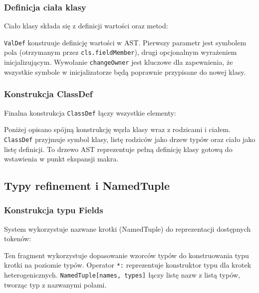 \subsubsection{Definicja ciała klasy}\label{subsubsec:definicja-ciaa-klasy}

Ciało klasy składa się z definicji wartości oraz metod:



\texttt{ValDef} konstruuje definicję wartości w AST. Pierwszy parametr jest symbolem pola (otrzymanym przez \texttt{cls.fieldMember}), drugi opcjonalnym wyrażeniem inicjalizującym.
Wywołanie \texttt{changeOwner} jest kluczowe dla zapewnienia, że wszystkie symbole w inicjalizatorze będą poprawnie przypisane do nowej klasy.

\subsubsection{Konstrukcja ClassDef}\label{subsubsec:konstrukcja-classdef}

Finalna konstrukcja \texttt{ClassDef} łączy wszystkie elementy:

Poniżej opisano spójną konstrukcję węzła klasy wraz z rodzicami i ciałem.
\texttt{ClassDef} przyjmuje symbol klasy, listę rodziców jako drzew typów oraz ciało jako listę definicji.
To drzewo AST reprezentuje pełną definicję klasy gotową do wstawienia w punkt ekspansji makra.

\subsection{Typy refinement i NamedTuple}\label{subsec:typy-refinement-i-namedtuple}

\subsubsection{Konstrukcja typu Fields}\label{subsubsec:konstrukcja-typu-fields}

System wykorzystuje nazwane krotki (NamedTuple) do reprezentacji dostępnych tokenów:



Ten fragment wykorzystuje dopasowanie wzorców typów do konstruowania typu krotki na poziomie typów.
Operator \texttt{*:} reprezentuje konstruktor typu dla krotek heterogenicznych. \texttt{NamedTuple[names, types]} łączy listę nazw z listą typów, tworząc typ z nazwanymi polami.

